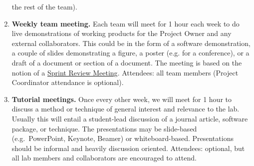 \documentclass{tufte-book} %
\begin{document}
\begin{enumerate}
the rest of the team).
\item \textbf{Weekly team meeting.}  Each team will meet for 1 hour
  each week to do live demonstrations of working products for the
  Project Owner and any external collaborators.  This could be in the
  form of a software demonstration, a couple of slides demonstrating a
  figure, a poster (e.g. for a conference), or a draft of a document
  or section of a document.  The meeting is based on the notion of a
  \href{http://scrumtrainingseries.com/SprintReviewMeeting/SprintReviewMeeting.htm}{Sprint
    Review Meeting}.  Attendees: all team members (Project Coordinator
  attendance is optional).
\item \textbf{Tutorial meetings.}  Once every other week, we will meet
  for 1 hour to discuss a method or technique of general interest and
  relevance to the lab.  Usually this will entail a student-lead
  discussion of a journal article, software package, or technique.
  The presentations may be slide-based (e.g.\ PowerPoint, Keynote,
  Beamer) or whiteboard-based.  Presentations should be informal and
  heavily discussion oriented.  Attendees: optional, but all lab
  members and collaborators are encouraged to attend.
\end{enumerate}

\end{document}
